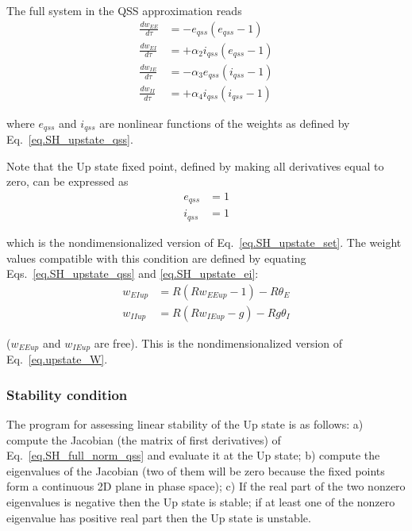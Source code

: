 \documentclass[twocolumn]{article}
\newcommand{\EE}{\mathit{EE}}
\newcommand{\EI}{\mathit{EI}}
\newcommand{\IE}{\mathit{IE}}
\newcommand{\II}{\mathit{II}}
\newcommand{\up}{\mathit{up}}
\newcommand{\qss}{\mathit{qss}}
\begin{document}
The full system in the QSS approximation reads
\begin{equation}
\begin{aligned}
\frac{dw_{\EE}}{d\tau} & = -e_{\qss}(e_{\qss}-1) \\
\frac{dw_{\EI}}{d\tau} & = +\alpha_2 i_{\qss}(e_{\qss}-1) \\
\frac{dw_{\IE}}{d\tau} & = -\alpha_3 e_{\qss}(i_{\qss}-1) \\
\frac{dw_{\II}}{d\tau} & = +\alpha_4 i_{\qss}(i_{\qss}-1)
\end{aligned}
\label{eq.SH_full_norm_qss}
\end{equation}

\noindent where $e_{\qss}$ and $i_{\qss}$ are nonlinear functions of the weights as defined by Eq.\ \ref{eq.SH_upstate_qss}.

Note that the Up state fixed point, defined by making all derivatives equal to zero, can be expressed as
\begin{equation}
\begin{aligned}
e_{\qss} & = 1 \\
i_{\qss} & = 1
\end{aligned}
\label{eq.SH_upstate_ei}
\end{equation}

\noindent which is the nondimensionalized version of Eq.\ \ref{eq.SH_upstate_set}. The weight values compatible with this condition are defined by equating Eqs.\ \ref{eq.SH_upstate_qss} and \ref{eq.SH_upstate_ei}:
\begin{equation}
\begin{aligned}
w_{\EI\up} & = R (Rw_{\EE\up} - 1) - R \theta_E \\
w_{\II\up} & = R (Rw_{\IE\up} - g) - Rg \theta_I
\end{aligned}
\label{eq.SH_upstate_w}
\end{equation}

\noindent ($w_{\EE\up}$ and $w_{\IE\up}$ are free). This is the nondimensionalized version of Eq.\ \ref{eq.upstate_W}.


\subsubsection{Stability condition}

The program for assessing linear stability of the Up state is as follows: a) compute the Jacobian (the matrix of first derivatives) of Eq.\ \ref{eq.SH_full_norm_qss} and evaluate it at the Up state; b) compute the eigenvalues of the Jacobian (two of them will be zero because the fixed points form a continuous 2D plane in phase space); c) If the real part of the two nonzero eigenvalues is negative then the Up state is stable; if at least one of the nonzero eigenvalue has positive real part then the Up state is unstable.
\end{document}
